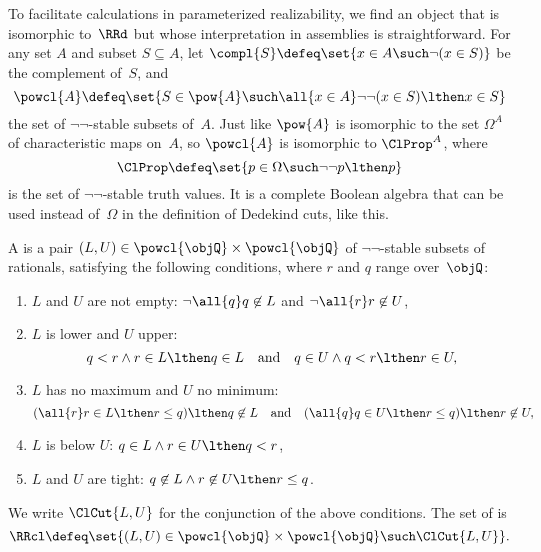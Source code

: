 To facilitate calculations in parameterized realizability, we find an object that is isomorphic to~$\RRd$ but whose interpretation in assemblies is straightforward.
%
For any set $A$ and subset $S \subseteq A$, let $\compl{S} \defeq \set{x \in A \such \neg (x \in S)}$ be the complement of~$S$, and
%
\begin{equation*}
  \powcl{A} \defeq \set{S \in \pow{A} \such \all{x \in A} \neg\neg(x \in S) \lthen x \in S}
\end{equation*}
%
the set of $\neg\neg$-stable subsets of~$A$. Just like $\pow{A}$ is isomorphic to the set $\Omega^A$ of characteristic maps on~$A$, so $\powcl{A}$ is isomorphic to $\ClProp^A$, where
%
\begin{equation*}
  \ClProp \defeq \set{p \in \Omega \such \neg\neg p \lthen p}
\end{equation*}
%
is the set of $\neg\neg$-stable truth values. It is a complete Boolean algebra that can be used instead of~$\Omega$ in the definition of Dedekind cuts, like this.

\begin{definition}
  A  is a pair $(L, U) \in \powcl{\objQ} \times \powcl{\objQ}$
  of $\neg\neg$-stable subsets of rationals, satisfying the following conditions, where $r$ and $q$ range over~$\objQ$:
  \begin{enumerate}
  \item $L$ and $U$ are not empty: $\lnot \all{q} q \not\in L$ and $\lnot \all{r} r \not\in U$,
  \item $L$ is lower and $U$ upper:
    \begin{equation*}
      q < r \land r \in L \lthen q \in L
      \quad\text{and}\quad
      q \in U \land q < r \lthen r \in U,
    \end{equation*}
  \item $L$ has no maximum and $U$ no minimum:
    \begin{equation*}
      (\all{r} r \in L \lthen r \leq q) \lthen q \not\in L
      \quad\text{and}\quad
      (\all{q} q \in U \lthen r \leq q) \lthen r \not\in U,
    \end{equation*}
  \item $L$ is below $U$: $q \in L \land r \in U \lthen q < r$,
  \item $L$ and $U$ are tight: $q \not\in L \land r \not\in U \lthen r \leq q$.
  \end{enumerate}
  We write $\ClCut{L, U}$ for the conjunction of the above conditions.
  The set of  is
  \begin{equation*}
    \RRcl \defeq \set{ (L, U) \in \powcl{\objQ} \times \powcl{\objQ} \such \ClCut{L, U}}.
  \end{equation*}
\end{definition}

